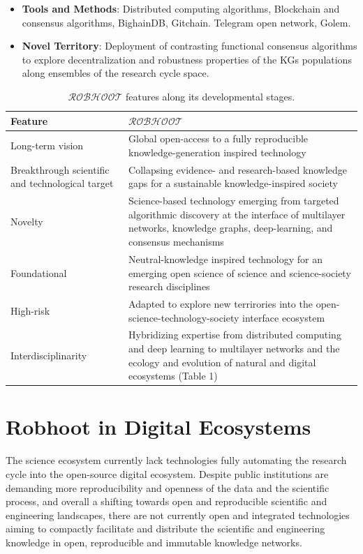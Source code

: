 \documentclass[10pt, a4paper, twocolumn]{article} %
\begin{document}
{   \begin{itemize}
   \item {\bf Tools and Methods}: Distributed computing algorithms,
     Blockchain and consensus algorithms, BighainDB,
     Gitchain. Telegram open network, Golem.
 \end{itemize}

 \begin{itemize}
 \item {\bf Novel Territory}: Deployment of contrasting functional
   consensus algorithms to explore decentralization and robustness
   properties of the KGs populations along ensembles of the research
   cycle space.
   \end{itemize}
  

\begin{table}[ht]
\begin{tabular}{ p{3.5cm} | p{14cm}}
  \hline \hline
  \textbf{Feature} &\textbf{$\mathcal{ROBHOOT}$}\\  \hline
  Long-term vision & Global open-access to a fully reproducible knowledge-generation inspired technology \\ \hline
  Breakthrough scientific and technological target & Collapsing evidence- and research-based knowledge gaps for a sustainable knowledge-inspired society\\ \hline
  Novelty & Science-based technology emerging from targeted algorithmic discovery at the interface of multilayer networks, knowledge graphs, deep-learning, and consensus mechanisms\\ \hline
  Foundational & Neutral-knowledge inspired technology for an emerging open science of science and science-society research disciplines \\ \hline
  High-risk & Adapted to explore new terrirories into the open-science-technology-society interface ecosystem \\ \hline
  Interdisciplinarity & Hybridizing expertise from distributed computing and deep learning to multilayer networks and the ecology and evolution of natural and digital ecosystems (Table 1) \\ \hline
  \bottomrule

\end{tabular}
\caption{{\bf $\mathcal{ROBHOOT}$} features along its developmental stages.}
\end{table}
 
  \section{Robhoot in Digital Ecosystems}
  The science ecosystem currently lack technologies fully automating
  the research cycle into the open-source digital ecosystem. Despite
  public institutions are demanding more reproducibility and openness
  of the data and the scientific process, and overall a shifting
  towards open and reproducible scientific and engineering landscapes,
  there are not currently open and integrated technologies aiming to
  compactly facilitate and distribute the scientific and engineering
  knowledge in open, reproducible and immutable knowledge networks.
  
}
\end{document}
